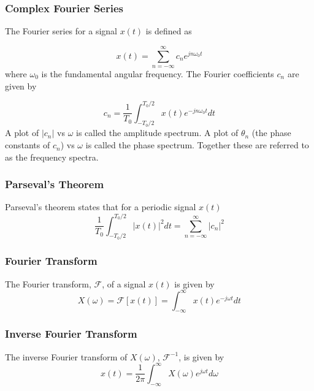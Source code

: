 \documentclass[]{article}
\begin{document}
\subsubsection{Complex Fourier Series}
The Fourier series for a signal $x(t)$ is defined as

\begin{equation} x(t) = \sum_{n=-\infty}^{\infty} c_{n} e^{jn\omega_{0}\label{complex_fourier_series} t}\end{equation}
where $\omega_{0}$ is the fundamental angular frequency.
The Fourier coefficients $c_{n}$ are given by

\begin{equation} c_{n} = \frac{1}{T_{0}} \int_{-T_{0}/2}^{T_{0}/2} x(t) e^{-jn\omega_{0}t} dt\label{complex_fourier_coefs} \end{equation}
A plot of $|c_{n}|$ vs $\omega$ is called the amplitude spectrum. A plot of $\theta_{n}$ (the phase constants of $c_{n}$) vs $\omega$ is called the phase spectrum. Together these are referred to as the frequency spectra.
\subsubsection{Parseval's Theorem}
Parseval's theorem states that for a periodic signal $x(t)$
\begin{equation} \frac{1}{T_{0}} \int_{-T_{0}/2}^{T_{0}/2} |x(t)|^2dt = \sum_{n=-\infty}^{\infty} |c_{n}|^2\label{parsevals_theorem} \end{equation}

\subsubsection{Fourier Transform}
The Fourier transform, $\mathscr{F}$, of a signal $x(t)$ is given by
\begin{equation} X(\omega) = \mathscr{F}[x(t)] = \int_{-\infty}^{\infty}x(t)e^{-j\omega t}dt\label{complex_fourier_transform} \end{equation}

\subsubsection{Inverse Fourier Transform}
The inverse Fourier transform of $X(\omega)$,  $\mathscr{F}^{-1}$, is given by
\begin{equation} x(t) = \frac{1}{2\pi} \int_{-\infty}^{\infty}X(\omega)e^{j\omega t} d\omega\label{inv_complex_fourier_transform} \end{equation}
\end{document}
